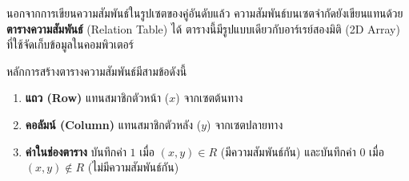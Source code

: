 นอกจากการเขียนความสัมพันธ์ในรูปเซตของคู่อันดับแล้ว ความสัมพันธ์บนเซตจำกัดยังเขียนแทนด้วย \textbf{ตารางความสัมพันธ์} (Relation Table) ได้ ตารางนี้มีรูปแบบเดียวกับอาร์เรย์สองมิติ (2D Array) ที่ใช้จัดเก็บข้อมูลในคอมพิวเตอร์

หลักการสร้างตารางความสัมพันธ์มีสามข้อดังนี้
\begin{enumerate}[label=\textbf{\arabic*.}]
    \item \textbf{แถว (Row)} แทนสมาชิกตัวหน้า ($x$) จากเซตต้นทาง
    \item \textbf{คอลัมน์ (Column)} แทนสมาชิกตัวหลัง ($y$) จากเซตปลายทาง
    \item \textbf{ค่าในช่องตาราง} บันทึกค่า $1$ เมื่อ $(x,y) \in R$ (มีความสัมพันธ์กัน) และบันทึกค่า $0$ เมื่อ $(x,y) \notin R$ (ไม่มีความสัมพันธ์กัน)
\end{enumerate}

